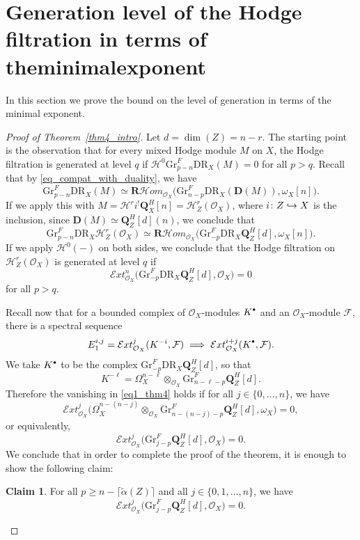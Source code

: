 \documentclass[11pt]{article}
\numberwithin{equation}{section}
\newcommand\hto{\mathrel{\lhook\joinrel\to}}
\newcommand{\sbullet}{{\scriptscriptstyle\bullet}}
\newcommand{\csbullet}{{\raisebox{1pt}{$\sbullet$}}}
\theoremstyle{plain}
\theoremstyle{definition}
\newtheorem{claim}[thm]{Claim}
\newcommand\Q{{\mathbf Q}}
\newcommand\R{{\mathbf R}}
\newcommand\cE{\mathcal{E}}
\newcommand\cF{\mathcal{F}}
\newcommand\cH{\mathcal{H}}
\newcommand\cO{\mathcal{O}}
\newcommand\cH{\mathcal{H}}
\newcommand\cO{\mathcal{O}}
\newcommand\gr{\mathrm{Gr}}
\newcommand\DR{\mathrm{DR}}
\begin{document}
\section{Generation level of the Hodge filtration in terms of the\nobreakspace minimal\nobreakspace exponent}\label{section4}

In this section we prove the bound on the level of generation in terms of the minimal exponent.

\begin{proof}[Proof of Theorem~\ref{thm4_intro}]
Let $d=\dim(Z)=n-r$.
The starting point is the observation that for every mixed Hodge module $M$ on $X$, the Hodge filtration is generated at level $q$ if $\cH^0 \gr^F_{p-n} \DR_X(M) = 0$ for all $p >q$. Recall that by \eqref{eq_compat_with_duality}, we have
\[ \gr^F_{p-n} \DR_X(M)\simeq \R\cH om_{\cO_X}\big(\gr^F_{n-p}\DR_X(\mathbf D(M)),\omega_X[n]\big).\]
If we apply this with $M=\cH^ri^!\Q_X^H[n]=\cH^r_Z(\cO_X)$, where $i\colon Z\hto X$ is the inclusion,
since ${\mathbf D}(M)\simeq \Q^H_Z[d](n)$, we conclude that
\[ \gr^F_{p-n} \DR_X \cH^r_Z(\cO_X) \simeq \R\cH om_{\cO_X}\big(\gr^F_{-p}\DR_X\Q_Z^H[d],\omega_X[n]\big).\]
If we apply $\cH^0(-)$ on both sides, we conclude that the Hodge filtration on $\cH^r_Z(\cO_X)$ is generated at level $q$ if
\begin{equation}\label{eq1_thm4}
\cE xt^n_{\cO_X}\big(\gr^F_{-p} \DR_X\Q_Z^H[d],\cO_X\big) = 0
\end{equation}
for all $p>q$.

Recall now that for a bounded complex of $\cO_X$-modules $K^\csbullet$ and an $\cO_X$-module $\cF$,
there is a spectral sequence
\[ E_1^{i,j} = \cE xt_{\cO_X}^j(K^{-i},\cF) \implies \cE xt^{i+j}_{\cO_X}(K^\csbullet,\cF).\]
We take $K^{\csbullet}$ to be the complex $\gr^F_{-p}\DR_X\Q_Z^H[d]$, so that
\[K^{-\ell}=\Omega_X^{n-\ell}\otimes_{\cO_X}\gr^F_{n-\ell-p}\Q_Z^H[d].\]
Therefore the vanishing in \eqref{eq1_thm4} holds if
for all $j\in\{0,\ldots,n\}$, we have\vspace*{-3pt}
\[ \cE xt_{\cO_X}^j \big(\Omega_X^{n-(n-j)}\otimes_{\cO_X}\gr^F_{n-(n-j)-p}\Q_Z^H[d],\omega_X\big)=0,\]
or equivalently,\vspace*{-3pt}
\[ \cE xt_{\cO_X}^j \big(\gr^F_{j-p}\Q_Z^H[d], \cO_X\big) = 0.\]
We conclude that in order to complete the proof of the theorem, it is enough to show
the following claim:
\begin{claim} For all $p \geq n - \lceil \widetilde{\alpha}(Z) \rceil$ and all $j\in \{0,1,\dots, n\}$, we have\vspace*{-3pt}
\begin{equation}\label{eq_claim}
\cE xt_{\cO_X}^j \big(\gr^F_{j-p}\Q_Z^H[d], \cO_X\big) = 0.
\end{equation}
\end{claim}


\end{proof}
\end{document}
